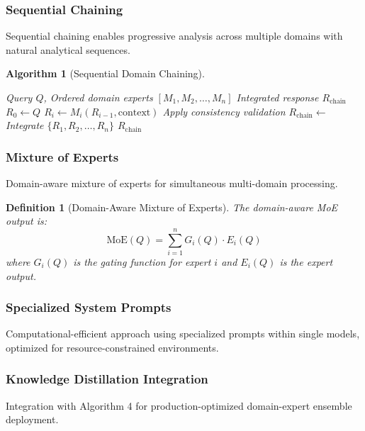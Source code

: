 \documentclass[12pt,a4paper]{article}
\newtheorem{definition}[theorem]{Definition}
\newtheorem{algorithm}[theorem]{Algorithm}
\begin{document}
\subsubsection{Sequential Chaining}

Sequential chaining enables progressive analysis across multiple domains with natural analytical sequences.

\begin{algorithm}[Sequential Domain Chaining]
\begin{algorithmic}[1]
\REQUIRE Query $Q$, Ordered domain experts $[M_1, M_2, \ldots, M_n]$
\ENSURE Integrated response $R_{\text{chain}}$
\STATE $R_0 \leftarrow Q$
    \STATE $R_i \leftarrow M_i(R_{i-1}, \text{context})$
    \STATE Apply consistency validation
\ENDFOR
\STATE $R_{\text{chain}} \leftarrow$ Integrate $\{R_1, R_2, \ldots, R_n\}$
\RETURN $R_{\text{chain}}$
\end{algorithmic}
\end{algorithm}

\subsubsection{Mixture of Experts}

Domain-aware mixture of experts for simultaneous multi-domain processing.

\begin{definition}[Domain-Aware Mixture of Experts]
The domain-aware MoE output is:
\begin{equation}
\text{MoE}(Q) = \sum_{i=1}^n G_i(Q) \cdot E_i(Q)
\end{equation}
where $G_i(Q)$ is the gating function for expert $i$ and $E_i(Q)$ is the expert output.
\end{definition}

\subsubsection{Specialized System Prompts}

Computational-efficient approach using specialized prompts within single models, optimized for resource-constrained environments.

\subsubsection{Knowledge Distillation Integration}

Integration with Algorithm 4 for production-optimized domain-expert ensemble deployment.
\end{document}

